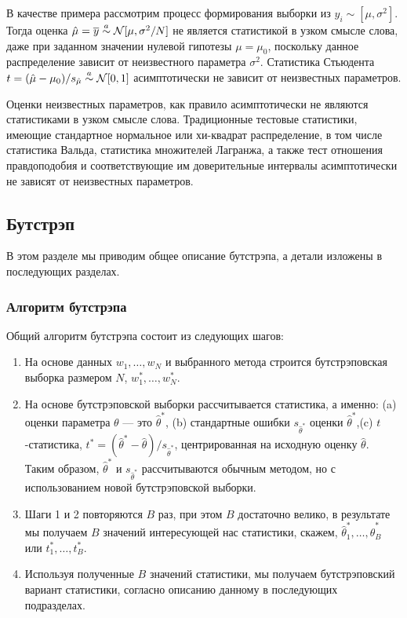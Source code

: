 В качестве примера рассмотрим процесс формирования выборки из $y_i \sim [\mu, \sigma^2]$. Тогда оценка $\hat{\mu}=\overline{y} \stackrel{a}{\sim} \mathcal{N}[\mu, \sigma^2/N]$ не является статистикой в узком смысле слова, даже при заданном значении нулевой гипотезы $\mu = \mu_0$, поскольку данное распределение зависит от неизвестного параметра $\sigma^2$. Статистика Стьюдента $t=(\hat{\mu} - \mu_0)/s_{\hat{\mu}} \stackrel{a}{\sim} \mathcal{N}[0,1]$ асимптотически не зависит от неизвестных параметров. 

Оценки неизвестных параметров, как правило асимптотически не являются статистиками в узком смысле слова. Традиционные тестовые статистики, имеющие стандартное нормальное или хи-квадрат распределение, в том числе статистика Вальда, статистика множителей Лагранжа, а также тест отношения правдоподобия и соответствующие им доверительные интервалы асимптотически не зависят от неизвестных параметров.  

\subsection{Бутстрэп}

В этом разделе мы приводим общее описание бутстрэпа, а детали изложены в последующих разделах.


\subsubsection*{Алгоритм бутстрэпа}


Общий алгоритм бутстрэпа состоит из следующих шагов:

\begin{enumerate}
\item  На основе данных $w_1,\ldots, w_N$ и выбранного метода строится бутстрэповская выборка размером $N$, $w_1^*,\ldots ,w_N^*$.


\item На основе бутстрэповской выборки рассчитывается статистика, а именно: (a) оценки параметра $\theta$ --- это $\hat{\theta}^*$, (b) стандартные ошибки $s_{\hat{\theta}^*}$ оценки $\hat{\theta}^*$,(c) $t$-статистика, $t^*=(\hat{\theta}^*-\hat{\theta})/s_{\hat{\theta}^*}$, центрированная на исходную оценку $\hat{\theta}$. Таким образом, $\hat{\theta}^*$ и $s_{\hat{\theta}^*}$ рассчитываются обычным методом, но с использованием новой бутстрэповской выборки.


\item Шаги 1 и 2  повторяются $B$ раз, при этом $B$ достаточно велико, в результате мы получаем $B$ значений интересующей нас статистики, скажем, $\hat{\theta}_1^*,\ldots ,\hat{\theta}_B^*$ или  $t_1^*,\ldots ,t_B^*$.

 
\item Используя полученные $B$ значений статистики, мы получаем  бутстрэповский вариант статистики, согласно описанию данному в последующих подразделах.
\end{enumerate}

